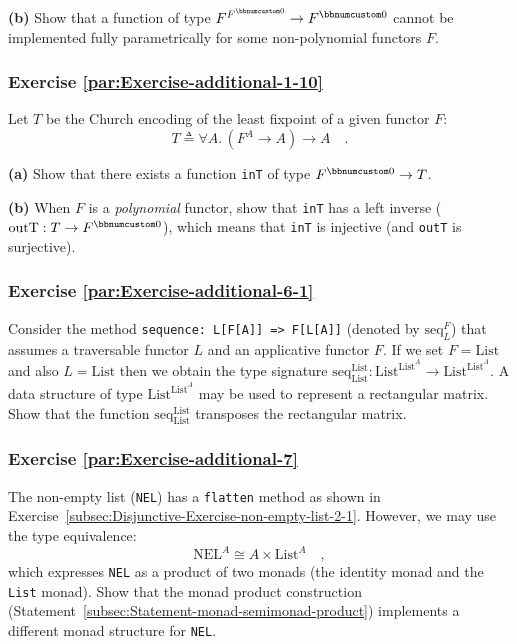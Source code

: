 \textbf{(b)} Show that a function of type $F^{F^{\bbnum 0}}\rightarrow F^{\bbnum 0}$
cannot be implemented fully parametrically for some non-polynomial
functors $F$.

\subsubsection{Exercise \label{par:Exercise-additional-1-10}\ref{par:Exercise-additional-1-10}}

Let $T$ be the Church encoding of the least fixpoint of a given functor
$F$:
\[
T\triangleq\forall A.\,(F^{A}\rightarrow A)\rightarrow A\quad.
\]

\textbf{(a)} Show that there exists a function \lstinline!inT! of
type $F^{\bbnum 0}\rightarrow T$.

\textbf{(b)} When $F$ is a \emph{polynomial} functor, show that \lstinline!inT!
has a left inverse ($\text{outT}:T\rightarrow F^{\bbnum 0}$), which
means that \lstinline!inT! is injective (and \lstinline!outT! is
surjective).

\subsubsection{Exercise \label{par:Exercise-additional-6-1}\ref{par:Exercise-additional-6-1}}

Consider the method \lstinline!sequence: L[F[A]] => F[L[A]]! (denoted
by $\text{seq}_{L}^{F}$) that assumes a traversable functor $L$
and an applicative functor $F$. If we set $F=\text{List}$ and also
$L=\text{List}$ then we obtain the type signature $\text{seq}_{\text{List}}^{\text{List}}:\text{List}^{\text{List}^{A}}\rightarrow\text{List}^{\text{List}^{A}}$.
A data structure of type $\text{List}^{\text{List}^{A}}$ may be used
to represent a rectangular matrix. Show that the function $\text{seq}_{\text{List}}^{\text{List}}$
transposes the rectangular matrix.

\subsubsection{Exercise \label{par:Exercise-additional-7}\ref{par:Exercise-additional-7}}

The non-empty list (\lstinline!NEL!) has a \lstinline!flatten! method
as shown in Exercise~\ref{subsec:Disjunctive-Exercise-non-empty-list-2-1}.
However, we may use the type equivalence:
\[
\text{NEL}^{A}\cong A\times\text{List}^{A}\quad,
\]
which expresses \lstinline!NEL! as a product of two monads (the identity
monad and the \lstinline!List! monad). Show that the monad product
construction (Statement~\ref{subsec:Statement-monad-semimonad-product})
implements a different monad structure for \lstinline!NEL!.

